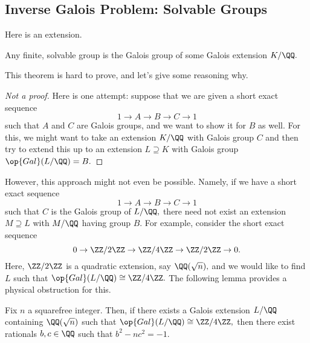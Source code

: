\subsection{Inverse Galois Problem: Solvable Groups}
Here is an extension.
\begin{theorem}[Shafarevich]
	Any finite, solvable group is the Galois group of some Galois extension $K/\QQ.$
\end{theorem}
This theorem is hard to prove, and let's give some reasoning why.
\begin{proof}[Not a proof]
	Here is one attempt: suppose that we are given a short exact sequence
	\[1\to A\to B\to C\to 1\]
	such that $A$ and $C$ are Galois groups, and we want to show it for $B$ as well. For this, we might want to take an extension $K/\QQ$ with Galois group $C$ and then try to extend this up to an extension $L\supseteq K$ with Galois group $\op{Gal}(L/\QQ)=B.$
\end{proof}
However, this approach might not even be possible. Namely, if we have a short exact sequence
\[1\to A\to B\to C\to 1\]
such that $C$ is the Galois group of $L/\QQ,$ there need not exist an extension $M\supseteq L$ with $M/\QQ$ having group $B.$ For example, consider the short exact sequence
\[0\to\ZZ/2\ZZ\to\ZZ/4\ZZ\to\ZZ/2\ZZ\to0.\]
Here, $\ZZ/2\ZZ$ is a quadratic extension, say $\QQ(\sqrt n),$ and we would like to find $L$ such that $\op{Gal}(L/\QQ)\cong\ZZ/4\ZZ.$ The following lemma provides a physical obstruction for this.
\begin{lemma}
	Fix $n$ a squarefree integer. Then, if there exists a Galois extension $L/\QQ$ containing $\QQ(\sqrt n)$ such that $\op{Gal}(L/\QQ)\cong\ZZ/4\ZZ,$ then there exist rationals $b,c\in\QQ$ such that $b^2-nc^2=-1.$
\end{lemma}
